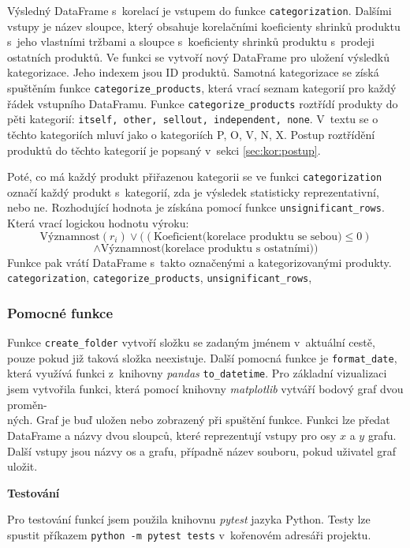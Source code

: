 Výsledný DataFrame s~korelací je vstupem do funkce \texttt{categorization}.  Dalšími vstupy je název sloupce, který obsahuje korelačními koeficienty shrinků produktu s~jeho vlastními tržbami a sloupce s~koeficienty shrinků produktu s~prodeji ostatních produktů. Ve funkci se vytvoří nový DataFrame pro uložení výsledků kategorizace. Jeho indexem jsou ID produktů. Samotná kategorizace se získá spuštěním funkce \texttt{categorize\_products}, která vrací seznam kategorií pro každý řádek vstupního DataFramu. Funkce \texttt{categorize\_products} roztřídí produkty do pěti kategorií: \texttt{itself, other, sellout, independent, none}. V~textu se o těchto kategoriích mluví jako o kategoriích P, O, V, N, X. Postup roztřídění produktů do těchto kategorií je popsaný v~sekci \ref{sec:kor:postup}.

Poté, co má každý produkt přiřazenou kategorii se ve funkci \texttt{categorization} označí každý produkt s~kategorií, zda je výsledek statisticky reprezentativní, nebo ne. Rozhodující hodnota je získána pomocí funkce \texttt{unsignificant\_rows}. Která vrací logickou hodnotu výroku:
$$ \mbox{Významnost}(r_i) \lor ( (\mbox{Koeficient(korelace produktu se sebou)} \leq 0) $$ 
$$ \land  \mbox{Významnost(korelace produktu s~ostatními)} ) $$
Funkce pak vrátí DataFrame s~takto označenými a kategorizovanými produkty.
\texttt{categorization}, \texttt{categorize\_products}, \texttt{unsignificant\_rows}, 

\subsubsection*{Pomocné funkce}

Funkce \texttt{create\_folder} vytvoří složku se zadaným jménem v~aktuální cestě, pouze pokud již taková složka neexistuje. Další pomocná funkce je \texttt{format\_date}, která využívá funkci z~knihovny \emph{pandas} \texttt{to\_datetime}. 
Pro základní vizualizaci jsem vytvořila funkci, která pomocí knihovny \emph{matplotlib} vytváří bodový graf dvou proměn-\\ných. Graf je buď uložen nebo zobrazený při spuštění funkce. Funkci lze předat DataFrame a názvy dvou sloupců, které reprezentují vstupy pro osy $x$ a $y$ grafu. Další vstupy jsou názvy os a grafu, případně název souboru, pokud uživatel graf uložit. 

\textbf{Testování}

Pro testování funkcí jsem použila knihovnu \emph{pytest} jazyka Python. Testy lze spustit příkazem \texttt{python -m pytest tests} v~kořenovém adresáři projektu.


